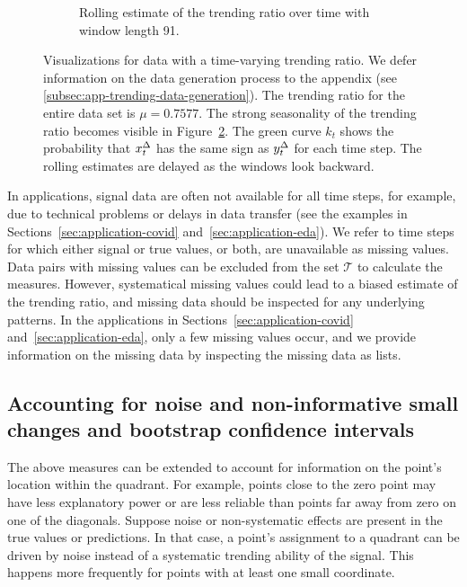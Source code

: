 \begin{figure}
\begin{subfigure}[t]{.48\textwidth}
    \caption{Rolling estimate of the trending ratio over time with window length 91. }\label{fig:trending_ratio_time_series}
    \end{subfigure}%
    \caption{Visualizations for data with a time-varying trending ratio. We defer information on the data generation process to the appendix (see \ref{subsec:app-trending-data-generation}). The trending ratio for the entire data set is $\mu = 0.7577$. The strong seasonality of the trending ratio becomes visible in Figure~\ref{fig:trending_ratio_time_series}. The green curve $k_t$ shows the probability that $x^{\Delta}_{t}$ has the same sign as $y^{\Delta}_{t}$ for each time step. The rolling estimates are delayed as the windows look backward.}
\end{figure} 

In applications, signal data are often not available for all time steps, for example, due to technical problems or delays in data transfer (see the examples in Sections~\ref{sec:application-covid} and~\ref{sec:application-eda}).
We refer to time steps for which either signal or true values, or both, are unavailable as missing values.
Data pairs with missing values can be excluded from the set $\mathcal{T}$ to calculate the measures. 
However, systematical missing values could lead to a biased estimate of the trending ratio, and missing data should be inspected for any underlying patterns.
In the applications in Sections~\ref{sec:application-covid} and~\ref{sec:application-eda}, only a few missing values occur, and we provide information on the missing data by inspecting the missing data as lists.

\subsection{Accounting for noise and non-informative small changes and bootstrap confidence intervals}\label{subsec:trending-noise}

The above measures can be extended to account for information on the point's location within the quadrant.
For example, points close to the zero point may have less explanatory power or are less reliable than points far away from zero on one of the diagonals.
Suppose noise or non-systematic effects are present in the true values or predictions. 
In that case, a point's assignment to a quadrant can be driven by noise instead of a systematic trending ability of the signal.
This happens more frequently for points with at least one small coordinate.

